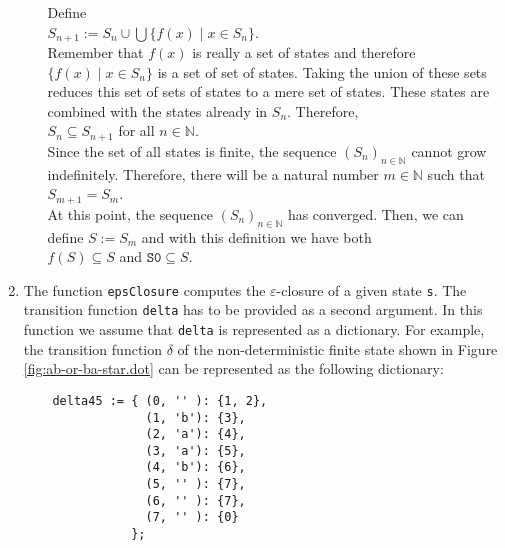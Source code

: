 \begin{enumerate}
\begin{enumerate}
            Define
            \\[0.2cm]
            \hspace*{1.3cm}
            $S_{n+1} := S_n \cup \bigcup \{ f(x) \mid x \in S_n \}$.
            \\[0.2cm]
            Remember that $f(x)$ is really a set of states and therefore $\{ f(x) \mid x \in S_n \}$
            is a set of set of states.  Taking the union of these sets reduces this set of sets of
            states to a mere
            set of states.  These states are combined with the states already in $S_n$.  Therefore,
            \\[0.2cm]
            \hspace*{1.3cm}
            $S_{n} \subseteq S_{n+1}$ \quad for all $n \in \mathbb{N}$.
            \\[0.2cm]
            Since the set of all states is finite, the sequence $(S_n)_{n\in\mathbb{N}}$ cannot grow indefinitely.
            Therefore, there will be a natural number $m \in \mathbb{N}$ such that 
            \\[0.2cm]
            \hspace*{1.3cm}
            $S_{m+1} = S_m$.
            \\[0.2cm]
            At this point, the sequence $(S_n)_{n \in \mathbb{N}}$ has converged. Then, 
            we can define $S := S_m$ and with this definition we have both 
            \\[0.2cm]
            \hspace*{1.3cm}
            $f(S) \subseteq S$ \quad and \quad $\texttt{S0} \subseteq S$.
      \end{enumerate}
\item The function \texttt{epsClosure} computes the $\varepsilon$-closure of a given state
      \texttt{s}.  The transition function \texttt{delta} has to be provided as a second
      argument.  In this function we assume that \texttt{delta} is represented as a dictionary.
      For example, the transition function $\delta$ of the non-deterministic finite state
      shown in Figure \ref{fig:ab-or-ba-star.dot} can be represented  as the
      following dictionary:
\begin{verbatim}
    delta45 := { (0, '' ): {1, 2},
                 (1, 'b'): {3},
                 (2, 'a'): {4},
                 (3, 'a'): {5},
                 (4, 'b'): {6},
                 (5, '' ): {7},
                 (6, '' ): {7},
                 (7, '' ): {0}
               };
\end{verbatim}

\end{enumerate}
